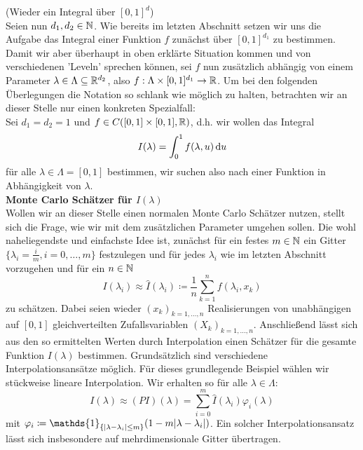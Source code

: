 \begin{Beispiel}(Wieder ein Integral über $[0,1]^d$)\\
	Seien nun $ d_1,d_2  \in \mathbb{N} $.
	Wie bereits im letzten Abschnitt setzen wir uns die Aufgabe das Integral einer Funktion $ f $ zunächst über $ [0,1]^{d_1} $ zu bestimmen. Damit wir aber überhaupt in oben erklärte Situation kommen und von verschiedenen 'Leveln' sprechen können, sei $ f $ nun zusätzlich abhängig von einem Parameter $ \lambda \in \Lambda \subseteq \mathbb{R}^{d_2}$, also $f : \Lambda \times [0,1]^{d_1} \to \mathbb{R} $. Um bei den folgenden Überlegungen die Notation so schlank wie möglich zu halten, betrachten wir an dieser Stelle nur einen konkreten Spezialfall: \\
	Sei $ d_1 = d_2 = 1 $ und $ f \in C([0,1]\times[0,1],\mathbb{R}) $, d.h. wir wollen das Integral 
	\[
		I(\lambda) = \int_{0}^{1} f(\lambda,u) \, \mathrm{d} u
	\]
	für alle $ \lambda \in \Lambda = [0,1] $ bestimmen, wir suchen also nach einer Funktion in Abhängigkeit von $ \lambda $.\\
	\newline
	\textbf{Monte Carlo Schätzer für $I(\lambda)$}\\
	Wollen wir an dieser Stelle einen normalen Monte Carlo Schätzer nutzen, stellt sich die Frage, wie wir mit dem zusätzlichen Parameter umgehen sollen. Die wohl naheliegendste und einfachste Idee ist, zunächst für ein festes $ m \in \mathbb{N} $ ein Gitter $ \{ \lambda_i = \frac{i}{m}, i=0,\dots,m\} $ festzulegen und für jedes $ \lambda_i $ wie im letzten Abschnitt vorzugehen und für ein $ n \in \mathbb{N} $
	\[
		I(\lambda_i) \approx \hat{I}(\lambda_i) \coloneqq \frac{1}{n} \sum_{k=1}^{n} f(\lambda_i,x_k)
	\]
	zu schätzen. Dabei seien wieder $ (x_k)_{k=1,\dots,n} $ Realisierungen von unabhängigen auf $ [0,1] $ gleichverteilten Zufallsvariablen $ (X_k)_{k=1,\dots,n} $.
	Anschließend lässt sich aus den so ermittelten Werten durch Interpolation einen Schätzer für die gesamte Funktion $ I(\lambda) $ bestimmen. Grundsätzlich sind verschiedene Interpolationsansätze möglich. Für dieses grundlegende Beispiel wählen wir stückweise lineare Interpolation. Wir erhalten so für alle $ \lambda \in \Lambda $:
	\[
		I(\lambda) \approx (PI)(\lambda) = \sum_{i=0}^{m} \hat{I}(\lambda_i) \varphi_i(\lambda)
	\]
	mit $ \varphi_i \coloneqq \mathds{1}_{ \{\abs{\lambda - \lambda_i} \leq m \} }(1-m\abs{\lambda-\lambda_i})$. Ein solcher Interpolationsansatz lässt sich insbesondere auf mehrdimensionale Gitter übertragen.

\end{Beispiel}
